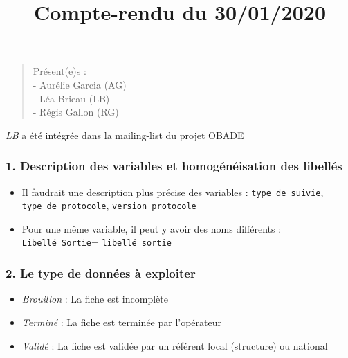 \documentclass[
]{article}
\title{Compte-rendu du \textbf{30/01/2020}}
\author{}
\date{\vspace{-2.5em}}
\providecommand{\tightlist}{%
  \setlength{\itemsep}{0pt}\setlength{\parskip}{0pt}}
\begin{document}
\maketitle

\begin{quote}
Présent(e)s :\\
- Aurélie Garcia (AG)\\
- Léa Brieau (LB)\\
- Régis Gallon (RG)
\end{quote}

\emph{LB} a été intégrée dans la mailing-list du projet OBADE

\hypertarget{description-des-variables-et-homoguxe9nuxe9isation-des-libelluxe9s}{%
\subsubsection{\texorpdfstring{\textbf{1. Description des variables et
homogénéisation des
libellés}}{1. Description des variables et homogénéisation des libellés}}\label{description-des-variables-et-homoguxe9nuxe9isation-des-libelluxe9s}}

\begin{itemize}
\tightlist
\item
  Il faudrait une description plus précise des variables :
  \texttt{type\ de\ suivie}, \texttt{type\ de\ protocole},
  \texttt{version\ protocole}
\item
  Pour une même variable, il peut y avoir des noms différents :
  \texttt{Libellé\ Sortie}= \texttt{libellé\ sortie}
\end{itemize}

\hypertarget{le-type-de-donnuxe9es-uxe0-exploiter}{%
\subsubsection{\texorpdfstring{\textbf{2. Le type de données à
exploiter}}{2. Le type de données à exploiter}}\label{le-type-de-donnuxe9es-uxe0-exploiter}}

\begin{itemize}
\tightlist
\item
  \emph{Brouillon} : La fiche est incomplète
\item
  \emph{Terminé} : La fiche est terminée par l'opérateur
\item
  \emph{Validé} : La fiche est validée par un référent local (structure)
  ou national
\end{itemize}
\end{document}
